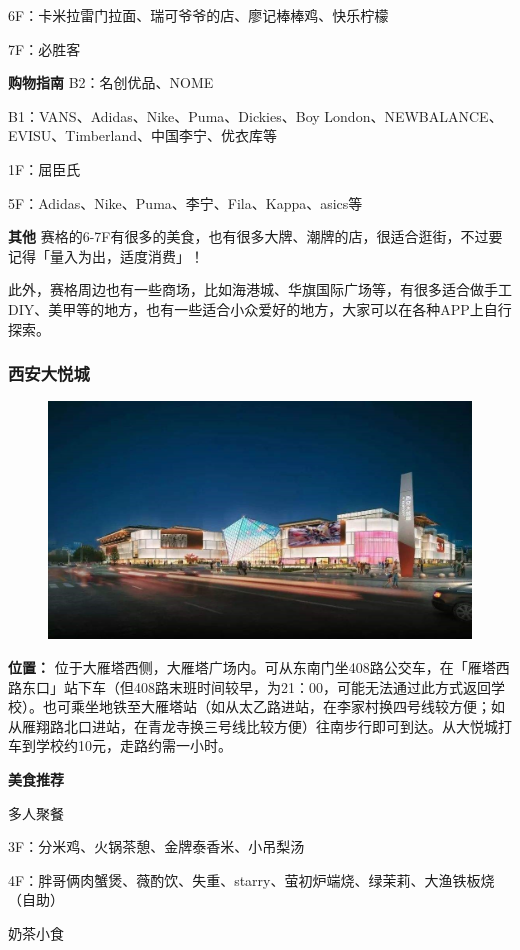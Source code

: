 \documentclass[
decoration,  %
]{qyxf-book}
\newcommand{\Noto}{\CJKfamily{zhsong}}
\begin{document}
6F：卡米拉雷门拉面、瑞可爷爷的店、廖记棒棒鸡、快乐柠檬

7F：必胜客

\textbf{购物指南}
B2：名创优品、NOME

B1：VANS、Adidas、Nike、Puma、Dickies、Boy
London、NEWBALANCE、EVISU、Timberland、中国李宁、优衣库等

1F：屈臣氏

5F：Adidas、Nike、Puma、李宁、Fila、Kappa、asics等

\textbf{其他}
赛格的6-7F有很多的美食，也有很多大牌、潮牌的店，很适合逛街，不过要记得「量入为出，适度消费」！

此外，赛格周边也有一些商场，比如海港城、华旗国际广场等，有很多适合做手工DIY、美甲等的地方，也有一些适合小众爱好的地方，大家可以在各种APP上自行探索。

\subsubsection{西安大悦城}


\begin{figure}[htbp]
	\centering
	\includegraphics[width=0.8\linewidth]{pics/image23.jpg}
\end{figure}

\textbf{位置：}
位于大雁塔西侧，大雁塔广场内。可从东南门坐408路公交车，在「雁塔西路东口」站下车（但408路末班时间较早，为21：00，可能无法通过此方式返回学校）。也可乘坐地铁至大雁塔站（如从太乙路进站，在李家村换四号线较方便；如从雁翔路北口进站，在青龙寺换三号线比较方便）往南步行即可到达。从大悦城打车到学校约10元，走路约需一小时。

\textbf{美食推荐}

多人聚餐

3F：分米鸡、\Noto{湊湊}火锅茶憩、金牌泰香米、小吊梨汤

4F：胖哥俩肉蟹煲、薇酌饮、失重、starry、萤初炉端烧、绿茉莉、大渔铁板烧（自助）

奶茶小食
\end{document}
